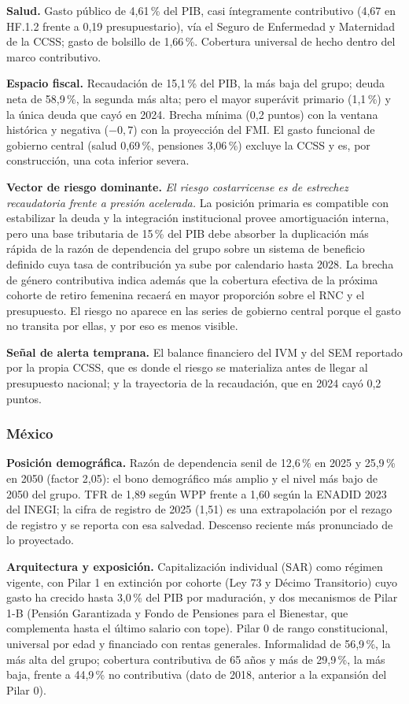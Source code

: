 \documentclass[12pt, letterpaper]{article}
\begin{document}
\textbf{Salud.} Gasto público de 4,61\,\% del PIB, casi íntegramente contributivo
(4,67 en HF.1.2 frente a 0,19 presupuestario), vía el Seguro de Enfermedad y
Maternidad de la CCSS; gasto de bolsillo de 1,66\,\%. Cobertura universal de hecho
dentro del marco contributivo.

\textbf{Espacio fiscal.} Recaudación de 15,1\,\% del PIB, la más baja del grupo;
deuda neta de 58,9\,\%, la segunda más alta; pero el mayor superávit primario
(1,1\,\%) y la única deuda que cayó en 2024. Brecha mínima (0,2 puntos) con la
ventana histórica y negativa ($-0{,}7$) con la proyección del FMI. El gasto
funcional de gobierno central (salud 0,69\,\%, pensiones 3,06\,\%) excluye la CCSS
y es, por construcción, una cota inferior severa.

\textbf{Vector de riesgo dominante.} \emph{El riesgo costarricense es de estrechez
recaudatoria frente a presión acelerada.} La posición primaria es compatible con estabilizar la
deuda y la integración institucional provee amortiguación interna, pero una base tributaria
de 15\,\% del PIB debe absorber la duplicación más rápida de la razón de
dependencia del grupo sobre un sistema de beneficio definido cuya tasa de
contribución ya sube por calendario hasta 2028. La brecha de género contributiva
indica además que la cobertura efectiva de la próxima cohorte de retiro femenina
recaerá en mayor proporción sobre el RNC y el presupuesto. El riesgo no aparece
en las series de gobierno central porque el gasto no transita por ellas, y por eso
es menos visible.

\textbf{Señal de alerta temprana.} El balance financiero del IVM y del SEM
reportado por la propia CCSS, que es donde el riesgo se materializa antes de
llegar al presupuesto nacional; y la trayectoria de la recaudación, que en 2024
cayó 0,2 puntos.

\subsubsection{México}

\textbf{Posición demográfica.} Razón de dependencia senil de 12,6\,\% en 2025 y
25,9\,\% en 2050 (factor 2,05): el bono demográfico más amplio y el nivel más bajo
de 2050 del grupo. TFR de 1,89 según WPP frente a 1,60 según la ENADID 2023 del
INEGI; la cifra de registro de 2025 (1,51) es una extrapolación por el rezago de
registro y se reporta con esa salvedad. Descenso reciente más pronunciado de lo
proyectado.

\textbf{Arquitectura y exposición.} Capitalización individual (SAR) como régimen
vigente, con Pilar 1 en extinción por cohorte (Ley 73 y Décimo Transitorio) cuyo
gasto ha crecido hasta 3,0\,\% del PIB por maduración, y dos mecanismos de Pilar
1-B (Pensión Garantizada y Fondo de Pensiones para el Bienestar, que complementa
hasta el último salario con tope). Pilar 0 de rango constitucional, universal por
edad y financiado con rentas generales. Informalidad de 56,9\,\%, la más alta del
grupo; cobertura contributiva de 65 años y más de 29,9\,\%, la más baja, frente a
44,9\,\% no contributiva (dato de 2018, anterior a la expansión del Pilar 0).
\end{document}

